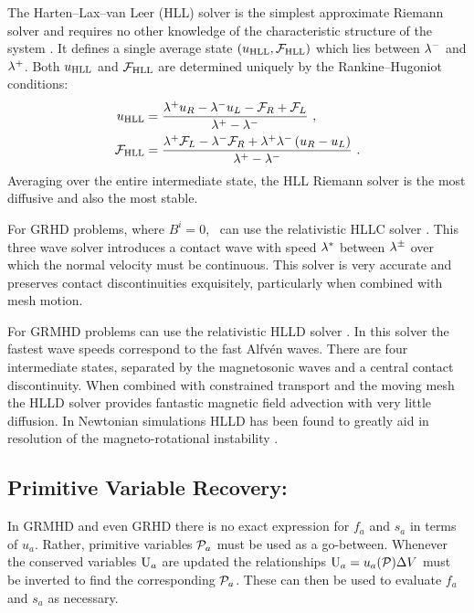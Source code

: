 The Harten--Lax--van Leer (HLL) solver is the simplest approximate Riemann solver and requires no other knowledge of the characteristic structure of the system \citep{HLL}.  It defines a single average state $(u_{\rm HLL}, \mathcal{F}_{\rm HLL})$ which lies between $\lambda^-$ and $\lambda^+$.  Both $u_{\rm HLL}$ and  $\mathcal{F}_{\rm HLL}$ are determined uniquely by the Rankine--Hugoniot conditions:
\begin{align}
	u_{\rm HLL} &= \frac{\lambda^+ u_R - \lambda^- u_L - \mathcal{F}_R + \mathcal{F}_L}{\lambda^+ - \lambda^-}\ , \\
	\mathcal{F}_{\rm HLL} &= \frac{\lambda^+ \mathcal{F}_L - \lambda^- \mathcal{F}_R +\lambda^+\lambda^-\left(u_R-u_L\right)}{\lambda^+ - \lambda^-}\ . \\
\end{align}
Averaging over the entire intermediate state, the HLL Riemann solver is the most diffusive and also the most stable.  

For GRHD problems, where $B^i = 0$, \grdisco\ can use the relativistic HLLC solver \citep{Toro94, Mignone05}.  This three wave solver introduces a contact wave with speed $\lambda^*$ between $\lambda^\pm$ over which the normal velocity must be continuous.  This solver is very accurate and preserves contact discontinuities exquisitely, particularly when combined with mesh motion.

For GRMHD problems \grdisco can use the relativistic HLLD solver \citep{HLLD,Mignone09}.  In this solver the fastest wave speeds correspond to the fast Alfv\'{e}n waves.  There are four intermediate states, separated by the magnetosonic waves and a central contact discontinuity.  When combined with constrained transport and the moving mesh the HLLD solver provides fantastic magnetic field advection with very little diffusion.  In Newtonian simulations HLLD has been found to greatly aid in resolution of the magneto-rotational instability \citep{Sorathia12}.

\subsection{Primitive Variable Recovery: \ctop}

In GRMHD and even GRHD there is no exact expression for $f_a$ and $s_a$ in terms of $u_a$.  Rather, primitive variables $\mathcal{P}_a$ must be used as a go-between. Whenever the conserved variables $\mathrm{U}_a$ are updated the relationships $\mathrm{U}_a = u_a(\mathcal{P}) \Delta V$ must be inverted to find the corresponding $\mathcal{P}_a$.  These can then be used to evaluate $f_a$ and $s_a$ as necessary.

